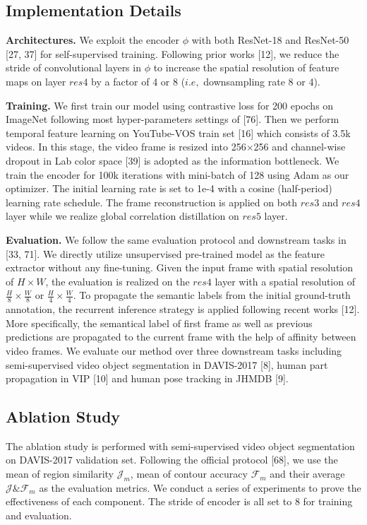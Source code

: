 \documentclass{article}
\begin{document}
\subsection{Implementation Details}
\textbf{Architectures.} We exploit the encoder $\phi$ with both ResNet-18 and ResNet-50 [27, 37] for self-supervised training. Following prior works [12], we reduce the stride of convolutional layers in $\phi$ to increase the spatial resolution of feature maps on layer $res4$  by a factor of 4 or 8 ($i.e,$ downsampling rate 8 or 4). 

\textbf{Training.}
We first train our model using contrastive loss for 200 epochs on ImageNet following most hyper-parameters settings of [76]. Then we perform temporal feature learning on YouTube-VOS train set [16] which consists of 3.5k videos. In this stage, the video frame is resized into 256$\times$256 and channel-wise dropout in Lab color space [39] is adopted as the information bottleneck. We train the encoder for 100k iterations with mini-batch of 128  using Adam as our optimizer. The initial learning rate is set to 1e-4 with a cosine (half-period) learning rate schedule. The frame reconstruction is applied on both $res3$ and $res4$ layer while we realize global correlation distillation on $res5$ layer.

\textbf{Evaluation.}
We follow the same evaluation protocol and downstream tasks in [33, 71]. We directly utilize unsupervised pre-trained model as the feature extractor without any fine-tuning.  Given the input frame with  spatial resolution of $H\times W$, the evaluation is realized on the $res4$ layer with a spatial resolution of $\frac{H}{8} \times \frac{W}{8}$ or $\frac{H}{4} \times \frac{W}{4}$. To propagate the semantic labels from the initial ground-truth annotation, the recurrent inference strategy is applied following recent works [12]. More specifically,  the semantical label of first frame as well as previous predictions are propagated to the current frame with the help of affinity between video frames. We evaluate our method over three downstream tasks including semi-supervised video object segmentation in DAVIS-2017 [8], human part propagation in VIP [10] and human pose tracking in JHMDB [9].

\subsection{Ablation Study}
The ablation study is performed with semi-supervised video object segmentation on DAVIS-2017 validation set. Following the official protocol [68], we use the mean of region similarity $\mathcal{J}_m$, mean of contour accuracy $\mathcal{F}_m$ and their average $\mathcal{J} \& \mathcal{F}_m$ as the evaluation metrics. We conduct a series of experiments to prove the effectiveness of each  component. The stride of encoder is all set to 8 for training and evaluation.
\end{document}
